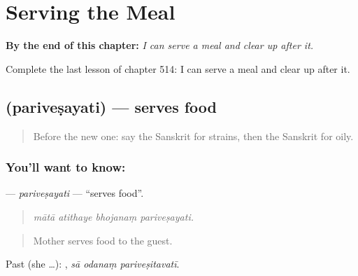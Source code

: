 
\chapter{Serving the Meal}
\label{ch:sa-serving-the-meal}

\begin{chapteropening}
\textbf{By the end of this chapter:} \emph{I can serve a meal and clear up after it.}

Complete the last lesson of chapter 514: I can serve a meal and clear up after it.
\end{chapteropening}

\section[\texorpdfstring{\sk{परिवेषयति} (pariveṣayati)}{परिवेषयति (pariveṣayati)}]{ (pariveṣayati) — serves food}

\label{lesson:SA-C514-parivesayati}



\begin{quote}
Before the new one: say the Sanskrit for strains, then the Sanskrit for oily.
\end{quote}

\subsection*{You'll want to know: }
\textbf{} — \emph{pariveṣayati} — \textquotedblleft{}serves food\textquotedblright{}.

\begin{quote}
   
\end{quote}

\begin{quote}
\emph{mātā atithaye bhojanaṃ pariveṣayati.}
\end{quote}

\begin{quote}
Mother serves food to the guest.
\end{quote}

Past (she …):   , \emph{sā odanaṃ pariveṣitavatī}.

